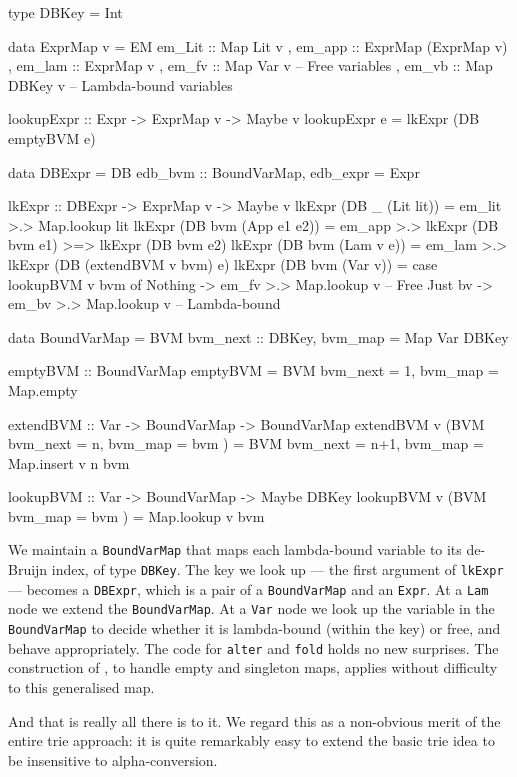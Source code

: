\documentclass[acmsmall]{acmart}
\theoremstyle{theorem}
\theoremstyle{definition}
\theoremstyle{remark}
\begin{document}
\begin{code}
type DBKey = Int

data ExprMap v = EM { em_Lit :: Map Lit v
                    , em_app :: ExprMap (ExprMap v)
                    , em_lam :: ExprMap v
                    , em_fv  :: Map Var v      -- Free variables
                    , em_vb  :: Map DBKey v } -- Lambda-bound variables

lookupExpr :: Expr -> ExprMap v -> Maybe v
lookupExpr e = lkExpr (DB emptyBVM e)

data DBExpr = DB { edb_bvm :: BoundVarMap, edb_expr = Expr }

lkExpr :: DBExpr -> ExprMap v -> Maybe v
lkExpr (DB _   (Lit lit))   = em_lit >.> Map.lookup lit
lkExpr (DB bvm (App e1 e2)) = em_app >.> lkExpr (DB bvm e1) >=> lkExpr (DB bvm e2)
lkExpr (DB bvm (Lam v e))   = em_lam >.> lkExpr (DB (extendBVM v bvm) e)
lkExpr (DB bvm (Var v))     = case lookupBVM v bvm of
                                Nothing -> em_fv  >.> Map.lookup v  -- Free
                                Just bv -> em_bv  >.> Map.lookup v  -- Lambda-bound

data BoundVarMap = BVM { bvm_next :: DBKey, bvm_map = Map Var DBKey }

emptyBVM :: BoundVarMap
emptyBVM = BVM { bvm_next = 1, bvm_map = Map.empty }

extendBVM :: Var -> BoundVarMap -> BoundVarMap
extendBVM v (BVM { bvm_next = n, bvm_map = bvm })
  = BVM { bvm_next = n+1, bvm_map = Map.insert v n bvm }

lookupBVM :: Var -> BoundVarMap -> Maybe DBKey
lookupBVM v (BVM {bvm_map = bvm }) = Map.lookup v bvm
\end{code}
We maintain a \lstinline{BoundVarMap}
that maps each lambda-bound variable to its de-Bruijn index, of type \lstinline{DBKey}.  The key
we look up --- the first argument of \lstinline{lkExpr} --- becomes a \lstinline{DBExpr},
which is a pair of a \lstinline{BoundVarMap} and an \lstinline{Expr}.
At a \lstinline{Lam}
node we extend the \lstinline{BoundVarMap}. At a \lstinline{Var} node we
look up the variable in the \lstinline{BoundVarMap} to decide whether it is
lambda-bound (within the key) or free, and behave appropriately.
The code for \lstinline{alter} and \lstinline{fold} holds no new surprises.
The construction of , to handle empty and singleton maps,
applies without difficulty to this generalised map.

And that is really all there is to it.  We regard this as a non-obvious merit
of the entire trie approach: it is quite remarkably easy to extend the basic
trie idea to be insensitive to alpha-conversion.
\end{document}
